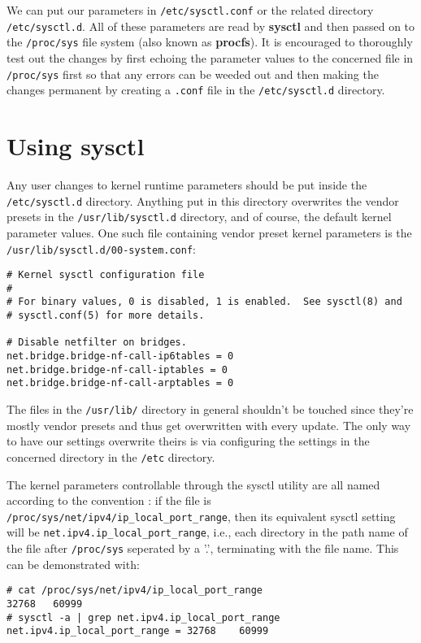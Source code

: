 We can put our parameters in \verb|/etc/sysctl.conf| or the related directory \verb|/etc/sysctl.d|. All of these parameters are read by \textbf{sysctl} and then passed on to the \verb|/proc/sys| file system (also known as \textbf{procfs}). It is encouraged to thoroughly test out the changes by first echoing the parameter values to the concerned file in \verb|/proc/sys| first so that any errors can be weeded out and then making the changes permanent by creating a \verb|.conf| file in the \verb|/etc/sysctl.d| directory. 

	\section{Using sysctl}
Any user changes to kernel runtime parameters should be put inside the \verb|/etc/sysctl.d| directory. Anything put in this directory overwrites the vendor presets in the \verb|/usr/lib/sysctl.d| directory, and of course, the default kernel parameter values. One such file containing vendor preset kernel parameters is the \verb|/usr/lib/sysctl.d/00-system.conf|:

\vspace{-15pt}
\begin{verbatim}
# Kernel sysctl configuration file
#
# For binary values, 0 is disabled, 1 is enabled.  See sysctl(8) and
# sysctl.conf(5) for more details.

# Disable netfilter on bridges.
net.bridge.bridge-nf-call-ip6tables = 0
net.bridge.bridge-nf-call-iptables = 0
net.bridge.bridge-nf-call-arptables = 0
\end{verbatim}
\vspace{-10pt}	

\noindent
The files in the \verb|/usr/lib/| directory in general shouldn't be touched since they're mostly vendor presets and thus get overwritten with every update. The only way to have our settings overwrite theirs is via configuring the settings in the concerned directory in the \verb|/etc| directory. 

The kernel parameters controllable through the sysctl utility are all named according to the convention : if the file is \verb|/proc/sys/net/ipv4/ip_local_port_range|, then its equivalent sysctl setting will be \verb|net.ipv4.ip_local_port_range|, i.e., each directory in the path name of the file after \verb|/proc/sys| seperated by a '.', terminating with the file name. This can be demonstrated with:

\vspace{-15pt}
\begin{verbatim}
# cat /proc/sys/net/ipv4/ip_local_port_range
32768	60999
# sysctl -a | grep net.ipv4.ip_local_port_range
net.ipv4.ip_local_port_range = 32768	60999
\end{verbatim}
\vspace{-10pt}	

